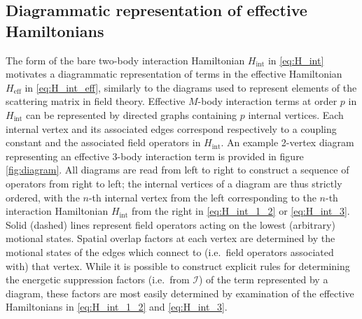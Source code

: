 \documentclass[preprint,showkeys,nofootinbib]{revtex4-1}
\renewcommand{\t}{\text} %
\newcommand{\I}{\mathcal{I}}
\newcommand{\1}{\mathds{1}}
\begin{document}
\subsection{Diagrammatic representation of effective Hamiltonians}

The form of the bare two-body interaction Hamiltonian $H_{\t{int}}$ in
\eqref{eq:H_int} motivates a diagrammatic representation of terms in
the effective Hamiltonian $H_{\t{eff}}$ in \eqref{eq:H_int_eff},
similarly to the diagrams used to represent elements of the scattering
matrix in field theory.  Effective $M$-body interaction terms at order
$p$ in $H_{\t{int}}$ can be represented by directed graphs containing
$p$ internal vertices.  Each internal vertex and its associated edges
correspond respectively to a coupling constant and the associated
field operators in $H_{\t{int}}$.  An example 2-vertex diagram
representing an effective 3-body interaction term is provided in
figure \ref{fig:diagram}.  All diagrams are read from left to right to
construct a sequence of operators from right to left; the internal
vertices of a diagram are thus strictly ordered, with the $n$-th
internal vertex from the left corresponding to the $n$-th interaction
Hamiltonian $H_{\t{int}}$ from the right in \eqref{eq:H_int_1_2} or
\eqref{eq:H_int_3}.  Solid (dashed) lines represent field operators
acting on the lowest (arbitrary) motional states.  Spatial overlap
factors at each vertex are determined by the motional states of the
edges which connect to (i.e.~field operators associated with) that
vertex.  While it is possible to construct explicit rules for
determining the energetic suppression factors (i.e.~from $\I$) of the
term represented by a diagram, these factors are most easily
determined by examination of the effective Hamiltonians in
\eqref{eq:H_int_1_2} and \eqref{eq:H_int_3}.
\end{document}
